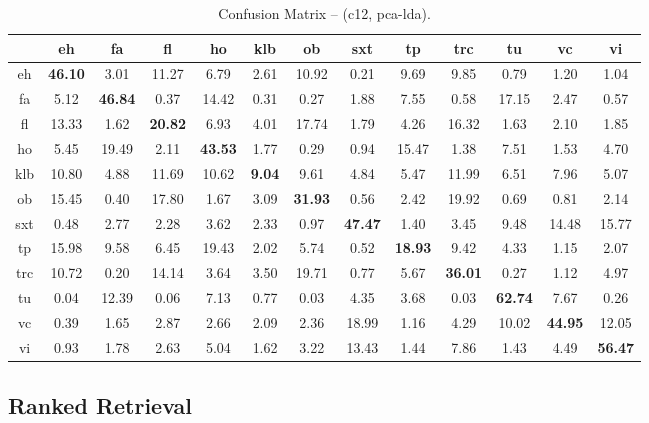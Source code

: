 \begin{table*}[h]
\begin{center}
\caption{Confusion Matrix -- (c12, pca-lda).}
\scriptsize
\begin{tabular}{ccccccccccccc}
\hline
     &    eh &    fa &   fl &    ho &   klb &    ob &   sxt &    tp &   trc &    tu &    vc &    vi \\
\hline
 eh  & \textbf{46.10} &  3.01 & 11.27 &  6.79 &  2.61 & 10.92 &  0.21 &  9.69 &  9.85 &  0.79 &  1.20 &  1.04 \\
 fa  &  5.12 & \textbf{46.84} &  0.37 & 14.42 &  0.31 &  0.27 &  1.88 &  7.55 &  0.58 & 17.15 &  2.47 &  0.57 \\
 fl & 13.33 &  1.62 & \textbf{20.82} &  6.93 &  4.01 & 17.74 &  1.79 &  4.26 & 16.32 &  1.63 &  2.10 &  1.85 \\
 ho  &  5.45 & 19.49 &  2.11 & \textbf{43.53} &  1.77 &  0.29 &  0.94 & 15.47 &  1.38 &  7.51 &  1.53 &  4.70 \\
 klb & 10.80 &  4.88 & 11.69 & 10.62 &  \textbf{9.04} &  9.61 &  4.84 &  5.47 & 11.99 &  6.51 &  7.96 &  5.07 \\
 ob  & 15.45 &  0.40 & 17.80 &  1.67 &  3.09 & \textbf{31.93} &  0.56 &  2.42 & 19.92 &  0.69 &  0.81 &  2.14 \\
 sxt &  0.48 &  2.77 &  2.28 &  3.62 &  2.33 &  0.97 & \textbf{47.47} &  1.40 &  3.45 &  9.48 & 14.48 & 15.77 \\
 tp  & 15.98 &  9.58 &  6.45 & 19.43 &  2.02 &  5.74 &  0.52 & \textbf{18.93} &  9.42 &  4.33 &  1.15 &  2.07 \\
 trc & 10.72 &  0.20 & 14.14 &  3.64 &  3.50 & 19.71 &  0.77 &  5.67 & \textbf{36.01} &  0.27 &  1.12 &  4.97 \\
 tu  &  0.04 & 12.39 &  0.06 &  7.13 &  0.77 &  0.03 &  4.35 &  3.68 &  0.03 & \textbf{62.74} &  7.67 &  0.26 \\
 vc  &  0.39 &  1.65 &  2.87 &  2.66 &  2.09 &  2.36 & 18.99 &  1.16 &  4.29 & 10.02 & \textbf{44.95} & 12.05 \\
 vi  &  0.93 &  1.78 &  2.63 &  5.04 &  1.62 &  3.22 & 13.43 &  1.44 &  7.86 &  1.43 &  4.49 & \textbf{56.47} \\
\hline
\end{tabular}
\label{tab:things}
\end{center}
\end{table*}

\subsection{Ranked Retrieval}
